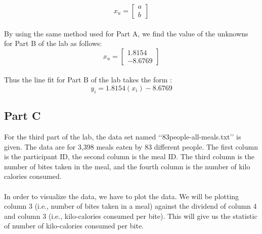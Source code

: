 \documentclass[12pt]{article}
\begin{document}
\begin{equation}
x_u  = 
	\begin{bmatrix}
	a \\
	b
	\end{bmatrix}
\end{equation} \\
\noindent
By using the same method used for Part A, we find the value of  the unknowns for Part B of the lab as follows: 
\begin{equation}
x_u  = 
	\begin{bmatrix}
	1.8154 \\
	-8.6769
	\end{bmatrix}
\end{equation} \\
\noindent
Thus the line fit for Part B of the lab takes the form :
\begin{equation}
y_i = 1.8154(x_i) - 8.6769
\label{ans:B}
\end{equation}

\subsection{Part C}
For the third part of the lab, the data set named \lq\lq{83people-all-meals.txt}\rq\rq{} is given. The data are for 3,398 meals eaten by 83 different people.  The first column is the participant ID, the second column is the meal ID.  The third column is the number of bites taken in the meal, and the fourth column is the number of kilo calories consumed.  \\ \\
In order to visualize the data, we have to plot the data. We will be plotting column 3 (i.e., number of bites taken in a meal) against the dividend of column 4 and column 3 (i.e., kilo-calories consumed per bite). This will give us the statistic of number of kilo-calories consumed per bite.  
\end{document}
